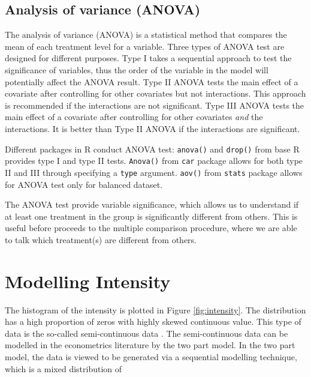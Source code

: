 \documentclass{monashthesis}
\begin{document}
\hypertarget{analysis-of-variance-anova}{%
\subsection{Analysis of variance (ANOVA)}\label{analysis-of-variance-anova}}

The analysis of variance (ANOVA) \autocites{faraway2016extending}{gelman2006data} is a statistical method that compares the mean of each treatment level for a variable. Three types of ANOVA test are designed for different purposes. Type I takes a sequential approach to test the significance of variables, thus the order of the variable in the model will potentially affect the ANOVA result. Type II ANOVA tests the main effect of a covariate after controlling for other covariates but not interactions. This approach is recommended if the interactions are not significant. Type III ANOVA tests the main effect of a covariate after controlling for other covariates \emph{and} the interactions. It is better than Type II ANOVA if the interactions are significant.

Different packages in R conduct ANOVA test: \texttt{anova()} and \texttt{drop()} from base R provides type I and type II tests. \texttt{Anova()} from \texttt{car} package allows for both type II and III through specifying a \texttt{type} argument. \texttt{aov()} from \texttt{stats} package allows for ANOVA test only for balanced dataset.

The ANOVA test provide variable significance, which allows us to understand if at least one treatment in the group is significantly different from others. This is useful before proceeds to the multiple comparison procedure, where we are able to talk which treatment(s) are different from others.

\newpage

\hypertarget{modelling-intensity}{%
\section{Modelling Intensity}\label{modelling-intensity}}

The histogram of the intensity is plotted in Figure \ref{fig:intensity}. The distribution has a high proportion of zeros with highly skewed continuous value. This type of data is the so-called semi-continuous data \autocites{Neelon2019}{twopart2010}. The semi-continuous data can be modelled in the econometrics literature by the two part model\autocites{cragg1971some}{manning1981two}. In the two part model, the data is viewed to be generated via a sequential modelling technique, which is a mixed distribution of
\end{document}
